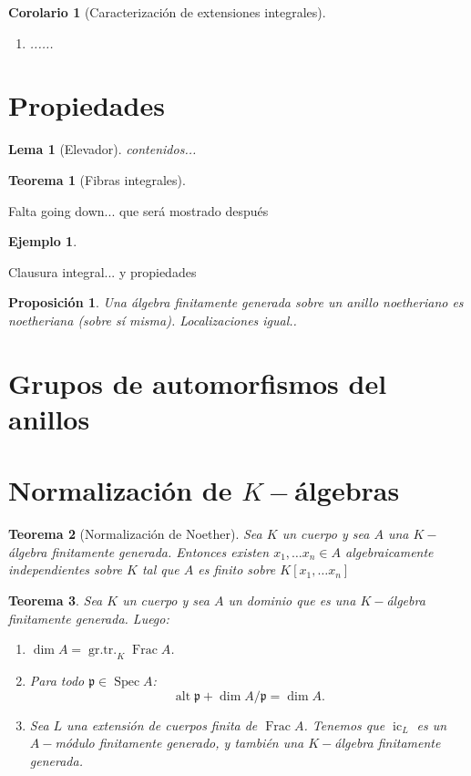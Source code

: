 \documentclass[12pt]{book}
\newtheorem{eje}{Ejemplo}
\newtheorem{teo}{Teorema}
\newtheorem{lem}{Lema}
\newtheorem{pro}{Proposición}
\newtheorem{cor}{Corolario}
\begin{document}
\begin{cor}[Caracterización de extensiones integrales]
	\begin{enumerate}
		\item ......
	\end{enumerate}
\end{cor}

\section{Propiedades}

\begin{lem}[Elevador]
	contenidos...
\end{lem}

\begin{teo}[Fibras integrales]
\end{teo}

Falta going down... que será mostrado después

\begin{eje}
\end{eje}

Clausura integral... y propiedades


\begin{pro}
Una álgebra finitamente generada sobre un anillo noetheriano es noetheriana (sobre sí misma). Localizaciones igual..
\end{pro}



\section{Grupos de automorfismos del anillos}




\section{Normalización de $K-$álgebras}

\begin{teo}[Normalización de Noether]
	Sea $K$ un cuerpo y sea $A$ una $K-$álgebra finitamente generada. Entonces existen $x_1 ,  \ldots x_n \in A$ algebraicamente independientes sobre $K$ tal que $A$ es finito sobre $K[x_1 ,  \ldots x_n] $ 
\end{teo}

\begin{teo}
	Sea $K$ un cuerpo y sea $A$ un dominio que es una $K-$álgebra finitamente generada. Luego:
	\begin{enumerate}
		\item $\dim A = \operatorname{gr.tr.}_K \operatorname{Frac} A$.
		\item Para todo $\mathfrak{p}\in \operatorname{Spec}A$: $$ \operatorname{alt} \mathfrak{p} + \dim A /\mathfrak{p} = \dim A. $$
		\item Sea $L$ una extensión de cuerpos finita de $\operatorname{Frac}A $. Tenemos que $\operatorname{ic}_L$ es un $A-$módulo finitamente generado, y también una $K-$álgebra finitamente generada. 
	\end{enumerate}
\end{teo}
\end{document}

